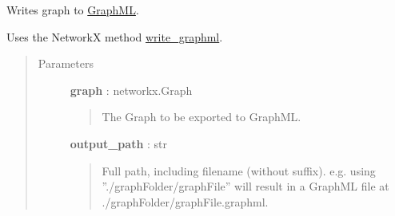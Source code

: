 \documentclass[letterpaper,10pt,english]{sphinxmanual}
\begin{document}

\begin{fulllineitems}
\label{tethne.writers:tethne.writers.graph.to_graphml}
Writes graph to \href{http://graphml.graphdrawing.org/}{GraphML}.

Uses the NetworkX method 
\href{http://networkx.lanl.gov/reference/generated/networkx.readwrite.graphml.write\_graphml.html}{write\_graphml}.
\begin{quote}\begin{description}
\item[{Parameters }] \leavevmode
\textbf{graph} : networkx.Graph
\begin{quote}

The Graph to be exported to GraphML.
\end{quote}

\textbf{output\_path} : str
\begin{quote}

Full path, including filename (without suffix).
e.g. using ''./graphFolder/graphFile'' will result in a GraphML file at
./graphFolder/graphFile.graphml.
\end{quote}

\end{description}\end{quote}

\end{fulllineitems}

\end{document}
